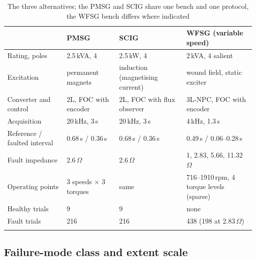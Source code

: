 \begin{table}[t]
\tabsize
\setlength{\tabcolsep}{4pt}
\caption{The three alternatives; the PMSG and SCIG share one bench and one protocol, the WFSG bench differs where indicated}\label{tab:alternatives}
\begin{tabular}{@{}p{2.4cm}p{2.8cm}p{3.3cm}p{3.4cm}@{}}
\toprule
 & PMSG & SCIG & WFSG (variable speed) \\
\midrule
Rating, poles & 2.5\,kVA, 4 & 2.5\,kW, 4 & 2\,kVA, 4 salient \\
Excitation & permanent magnets & induction (magnetising current) & wound field, static exciter \\
Converter and control & 2L, FOC with encoder & 2L, FOC with flux observer & 3L-NPC, FOC with encoder \\
Acquisition & 20\,kHz, 3\,s & 20\,kHz, 3\,s & 4\,kHz, 1.3\,s \\
Reference / faulted interval & 0.68\,s / 0.36\,s & 0.68\,s / 0.36\,s & 0.49\,s / 0.06--0.28\,s \\
Fault impedance & 2.6\,$\Omega$ & 2.6\,$\Omega$ & 1, 2.83, 5.66, 11.32\,$\Omega$ \\
Operating points & 3 speeds $\times$ 3 torques & same & 716--1910\,rpm, 4 torque levels (sparse) \\
Healthy trials & 9 & 9 & none \\
Fault trials & 216 & 216 & 438 (198 at 2.83\,$\Omega$) \\
\botrule
\end{tabular}
\end{table}



\subsection{Failure-mode class and extent scale}\label{sec:extent}

